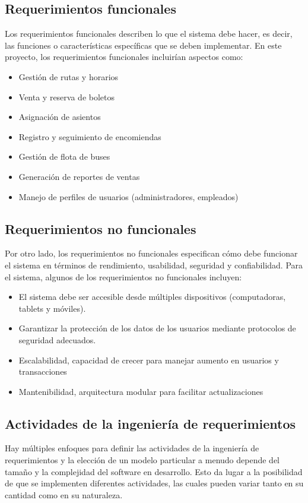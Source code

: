 	\subsection{Requerimientos funcionales}
		Los requerimientos funcionales describen lo que el sistema debe hacer, es decir, las funciones o características específicas que se deben implementar. En este proyecto, los requerimientos funcionales incluirían aspectos como:
		\begin{itemize}[label=$\bullet$, left=0cm, labelsep = 1.05cm, topsep = 0pt, parsep = 0pt]
			\item Gestión de rutas y horarios
			\item Venta y reserva de boletos
			\item Asignación de asientos
			\item Registro y seguimiento de encomiendas
			\item Gestión de flota de buses
			\item Generación de reportes de ventas
			\item Manejo de perfiles de usuarios (administradores, empleados)
		\end{itemize}
	\subsection{Requerimientos no funcionales}
		Por otro lado, los requerimientos no funcionales especifican cómo debe funcionar el sistema en términos de rendimiento, usabilidad, seguridad y confiabilidad. Para el sistema, algunos de los requerimientos no funcionales incluyen:
		\begin{itemize}[label=$\bullet$, left=0cm, labelsep = 1.05cm, topsep = 0pt, parsep = 0pt]
			\item El sistema debe ser accesible desde múltiples dispositivos (computadoras, tablets y móviles).
			\item Garantizar la protección de los datos de los usuarios mediante protocolos de seguridad adecuados.
			\item Escalabilidad, capacidad de crecer para manejar aumento en usuarios y transacciones
			\item Mantenibilidad, arquitectura modular para facilitar actualizaciones
		\end{itemize}
	\subsection{Actividades de la ingeniería de requerimientos}
		Hay múltiples enfoques para definir las actividades de la ingeniería de requerimientos y la elección de un modelo particular a menudo depende del tamaño y la complejidad del software en desarrollo. Esto da lugar a la posibilidad de que se implementen diferentes actividades, las cuales pueden variar tanto en su cantidad como en su naturaleza.
		
